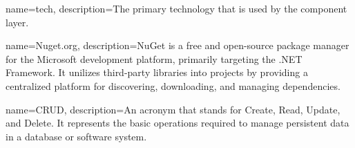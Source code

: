 {
    name=tech,
    description={The primary technology that is used by the component layer.}
}

{ name=Nuget.org, description={NuGet is a free and open-source package manager for the
    Microsoft development platform, primarily targeting the .NET Framework. It unilizes
    third-party libraries into projects by providing a centralized platform for
    discovering, downloading, and managing dependencies.} }

{ name=CRUD, description={An acronym that stands for Create, Read, Update, and Delete. It
represents the basic operations required to manage persistent data in a database or
software system.} }